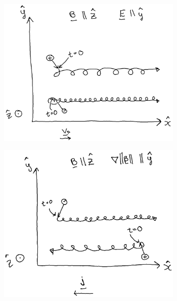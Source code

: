 \begin{enumerate}
\begin{figure}[t]
        \begin{subfigure}[t]{.3\linewidth}
            \centering
            \includegraphics[width=.95\linewidth]{bilder/L7_ExB.png}
            \caption{}\label{fig:L7_ExB}
        \end{subfigure}
        \begin{subfigure}[t]{.3\linewidth}
            \centering
            \includegraphics[width=.95\linewidth]{bilder/L7_gradB.png}
            \caption{}\label{fig:L7_gradB}
        \end{subfigure}
        \begin{subfigure}[t]{.3\linewidth}

\end{subfigure}
\end{figure}
\end{enumerate}
